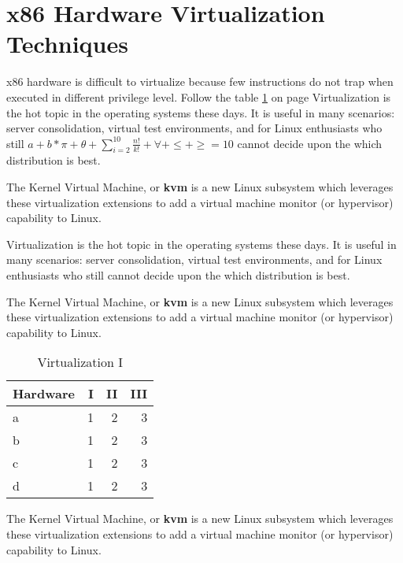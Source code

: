 %
 \section{x86 Hardware Virtualization Techniques}
  x86 hardware is difficult to virtualize because few instructions\cite{ER}
  do not trap when executed in different privilege level. Follow the table \ref{table:virtualization 1} on page \pageref{table:virtualization 1}
  \noindent Virtualization is the hot topic in the operating systems 
  these days. It is useful in many scenarios: server consolidation,
  virtual test environments, and for Linux enthusiasts who
  still \begin{math}
          a + b * \pi + \theta + \sum\limits_{i=2}^{10}\frac{n!}{k!} + \forall + \leq + \geq =10
        \end{math}
 cannot decide upon the which distribution is best.
  
  
  
  \noindent The Kernel Virtual Machine, or \textbf{kvm} is a new Linux
  subsystem which leverages these virtualization extensions
  to add a virtual machine monitor (or hypervisor) capability to Linux.
  
  \noindent Virtualization is the hot topic in the operating systems 
  these days. It is useful in many scenarios: server consolidation,
  virtual test environments, and for Linux enthusiasts who
  still cannot decide upon the which distribution is best.
  
  \noindent The Kernel Virtual Machine, or \textbf{kvm} is a new Linux
  subsystem which leverages these virtualization extensions
  to add a virtual machine monitor (or hypervisor) capability to Linux.
  
 \begin{table}[ht]
  \centering
  \begin{tabular}{l r r r}
  \hline
  Hardware & I & II & III\\[0.5ex]
  \hline
  a & 1 & 2 & 3\\
  b & 1 & 2 & 3\\
  c & 1 & 2 & 3\\
  d & 1 & 2 & 3\\
  \hline
  \end{tabular}
  \caption{Virtualization I}
  \label{table:virtualization 1}
 \end{table}

  \noindent The Kernel Virtual Machine\cite{SH:13}, or \textbf{kvm} is a new Linux
  subsystem which leverages these virtualization extensions
  to add a virtual machine monitor (or hypervisor) capability to Linux.
  
